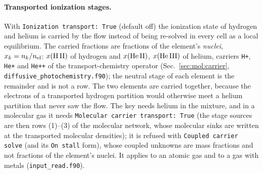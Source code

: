 \paragraph{Transported ionization stages.} With \texttt{Ionization
transport: True} (default off) the ionization state of hydrogen and helium is
carried by the flow instead of being re-solved in every cell as a local
equilibrium. The carried fractions are fractions of the element's
\emph{nuclei}, $x_k = n_k/n_{\rm el}$: $x({\rm H\,II})$ of hydrogen and
$x({\rm He\,II})$, $x({\rm He\,III})$ of helium, carriers \texttt{H+},
\texttt{He+} and \texttt{He++} of the transport-chemistry operator
(Sec.~\ref{sec:mol:carrier}, \texttt{diffusive\_photochemistry.f90}); the
neutral stage of each element is the remainder and is not a row. The two
elements are carried together, because the electrons of a transported
hydrogen partition would otherwise meet a helium partition that never saw the
flow. The key needs helium in the mixture, and in a molecular gas it needs
\texttt{Molecular carrier transport: True} (the stage sources are then rows
(1)--(3) of the molecular network, whose molecular sinks are written at the
transported molecular densities); it is refused with \texttt{Coupled carrier
solve} (and its \texttt{On stall} form), whose coupled unknowns are mass
fractions and not fractions of the element's nuclei. It applies to an atomic
gas and to a gas with metals (\texttt{input\_read.f90}).

